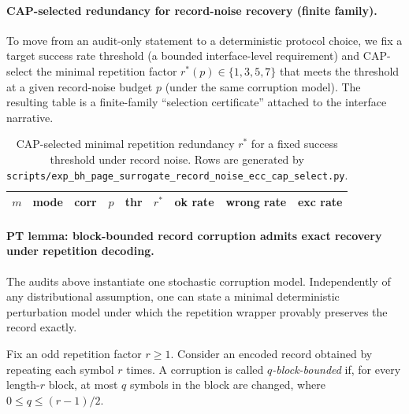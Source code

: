 %

\paragraph{CAP-selected redundancy for record-noise recovery (finite family).}
\AuditTag To move from an audit-only statement to a deterministic protocol choice, we fix a target success rate
threshold (a bounded interface-level requirement) and CAP-select the minimal repetition factor
$r^\ast(p)\in\{1,3,5,7\}$ that meets the threshold at a given record-noise budget $p$ (under the same corruption model).
The resulting table is a finite-family ``selection certificate'' attached to the interface narrative.

\begin{table}[t]
\centering
\scriptsize
\setlength{\tabcolsep}{6pt}
\renewcommand{\arraystretch}{1.15}
\begin{tabular}{r l l r r r r r r}
\toprule
$m$ & mode & corr & $p$ & thr & $r^\ast$ & ok rate & wrong rate & exc rate \\
\midrule
%
\end{tabular}
\caption{CAP-selected minimal repetition redundancy $r^\ast$ for a fixed success threshold under record noise.
Rows are generated by \texttt{scripts/exp\_bh\_page\_surrogate\_record\_noise\_ecc\_cap\_select.py}.}
\label{tab:bh_page_record_noise_ecc_cap_select}
\end{table}

%

\paragraph{PT lemma: block-bounded record corruption admits exact recovery under repetition decoding.}
\AuditTag The audits above instantiate one stochastic corruption model. Independently of any distributional assumption,
one can state a minimal deterministic perturbation model under which the repetition wrapper provably preserves the
record exactly.

\begin{definition}\label{def:bh_block_bounded_record_corruption}
Fix an odd repetition factor $r\ge 1$. Consider an encoded record obtained by repeating each symbol $r$ times.
A corruption is called \emph{$q$-block-bounded} if, for every length-$r$ block, at most $q$ symbols in the block are
changed, where $0\le q\le (r-1)/2$.
\end{definition}

